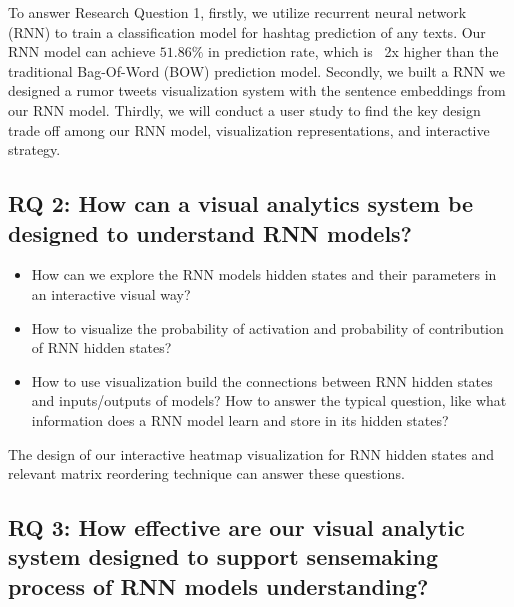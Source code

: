 To answer Research Question 1,  firstly, we utilize recurrent neural network (RNN) to train a classification model for hashtag prediction of any texts. Our RNN model can achieve $51.86\%$ in prediction rate, which is ~2x higher than the traditional Bag-Of-Word (BOW) prediction model. Secondly, we built a RNN we designed a rumor tweets visualization system with the sentence embeddings from our RNN model. Thirdly, we will conduct a user study to find the key design trade off among our RNN model, visualization representations, and interactive strategy.

\subsection{RQ 2: How can a visual analytics system be designed to understand RNN models? }
 
 
\begin{itemize}
    \item How can we explore the RNN models hidden states and their parameters in an interactive visual way?
    \item How to visualize the probability of activation and probability of contribution of RNN hidden states? 
    \item How to use visualization build the connections between RNN hidden states and inputs/outputs of models? How to answer the typical question, like what information does a RNN model learn and store in its hidden states?
\end{itemize}


The design of our interactive heatmap visualization for RNN hidden states and relevant matrix reordering technique can answer these questions. 



\subsection{RQ 3: How effective are our visual analytic system designed to support sensemaking process of RNN models understanding? }

